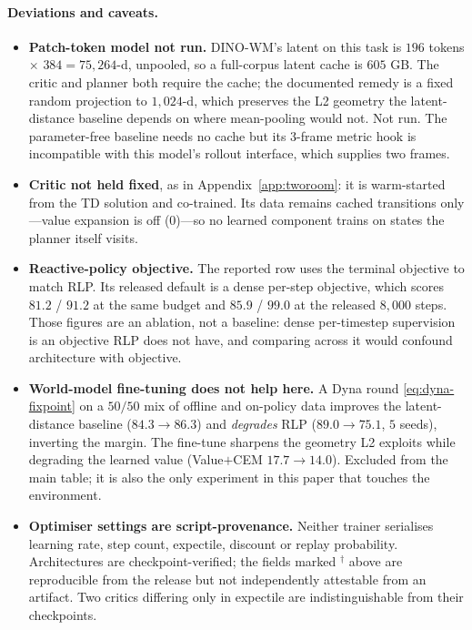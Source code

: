 \paragraph{Deviations and caveats.}
\begin{itemize}\itemsep1pt \parskip0pt 
  \item \textbf{Patch-token model not run.} DINO-WM's latent on this task is
    $196$ tokens $\times$ $384 = 75{,}264$-d, unpooled, so a full-corpus
    latent cache is $605$ GB. The critic and planner both require the cache;
    the documented remedy is a fixed random projection to $1{,}024$-d, which
    preserves the L2 geometry the latent-distance baseline depends on where
    mean-pooling would not. Not run. The parameter-free baseline needs no cache
    but its $3$-frame metric hook is incompatible with this model's rollout
    interface, which supplies two frames.
  \item \textbf{Critic not held fixed}, as in Appendix~\ref{app:tworoom}: it is
    warm-started from the TD solution and co-trained. Its data remains cached
    transitions only---value expansion is off ($0$)---so no learned component
    trains on states the planner itself visits.
  \item \textbf{Reactive-policy objective.} The reported row uses the terminal
    objective to match RLP. Its released default is a dense per-step objective,
    which scores $81.2$ / $91.2$ at the same budget and $85.9$ / $99.0$ at the
    released $8{,}000$ steps. Those figures are an ablation, not a baseline:
    dense per-timestep supervision is an objective RLP does not have, and
    comparing across it would confound architecture with objective.
  \item \textbf{World-model fine-tuning does not help here.} A Dyna round
    \eqref{eq:dyna-fixpoint} on a $50/50$ mix of offline and on-policy data
    improves the latent-distance baseline ($84.3 \to 86.3$) and \emph{degrades}
    RLP ($89.0 \to 75.1$, $5$ seeds), inverting the margin. The fine-tune
    sharpens the geometry L2 exploits while degrading the learned value
    (Value$+$CEM $17.7 \to 14.0$). Excluded from the main table; it is also the
    only experiment in this paper that touches the environment.
  \item \textbf{Optimiser settings are script-provenance.} Neither trainer
    serialises learning rate, step count, expectile, discount or replay
    probability. Architectures are checkpoint-verified; the fields marked
    $^\dagger$ above are reproducible from the release but not independently
    attestable from an artifact. Two critics differing only in expectile are
    indistinguishable from their checkpoints.
\end{itemize}

